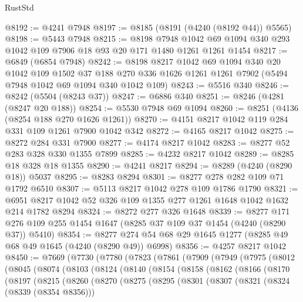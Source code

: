 \begin{lexlean}{RustStd}
\begin{coremodule}
@8192 := @4241 @7948
@8197 := @8185 (@8191 (@4240 (@8192 @44)) @5565)
@8198 := @5443 @7948
@8215 := @8198
    @7948
    @1042
    @69
    @1094
    @340
    @293
    @1042
    @109
    @7906
    @18
    @93
    @20
    @171
    @1480
    @1261
    @1261
    @1454
@8217 := @6849 (@6854 @7948)
@8242 := @8198
    @8217
    @1042
    @69
    @1094
    @340
    @20
    @1042
    @109
    @1502
    @37
    @188
    @270
    @336
    @1626
    @1261
    @1261
    @7902
    (@5494 @7948 @1042 @69 @1094 @340 @1042 @109)
@8243 := @5516 @340
@8246 := @8242 (@5504 (@8243 @37))
@8247 := @6886 @340
@8251 := @8246 (@4281 (@8247 @20 @188))
@8254 := @5530 @7948 @69 @1094
@8260 := @8251 (@4136 (@8254 @188 @270 @1626 @1261))
@8270 := @4151 @8217 @1042 @119 @284 @331 @109 @1261 @7900 @1042 @342
@8272 := @4165 @8217 @1042
@8275 := @8272 @284 @331 @7900
@8277 := @4174 @8217 @1042
@8283 := @8277 @52 @283 @328 @330 @1355 @7899
@8285 := @4232 @8217 @1042
@8289 := @8285 @18 @328 @18 @1355
@8290 := @4241 @8217
@8294 := @8289 (@4240 (@8290 @18)) @5037
@8295 := @8283 @8294
@8301 := @8277 @278 @282 @109 @71 @1792 @6510
@8307 := @5113 @8217 @1042 @278 @109 @1786 @1790
@8321 := @6951 @8217 @1042 @52 @326 @109 @1355 @277 @1261 @1648 @1042 @1632 @214 @1782 @8294
@8324 := @8272 @277 @326 @1648
@8339 := @8277 @171 @276 @109 @255 @1454 @1647 (@8285 @37 @109 @37 @1454 (@4240 (@8290 @37)) @5410)
@8354 := @8277 @274 @54 @68 @29 @1645 @1277 (@8285 @49 @68 @49 @1645 (@4240 (@8290 @49)) @6998)
@8356 := @4257 @8217 @1042
@8450 := @7669
    (@7730
      (@7780
        (@7823
          (@7861
            (@7909
              (@7949
                (@7975
                  (@8012
                    (@8045
                      (@8074
                        (@8103
                          (@8124
                            (@8140
                              (@8154
                                (@8158
                                  (@8162
                                    (@8166
                                      (@8170
                                        (@8197
                                          (@8215
                                            (@8260
                                              (@8270
                                                (@8275
                                                  (@8295
                                                    (@8301
                                                      (@8307
                                                        (@8321
                                                          (@8324 (@8339 (@8354 @8356)))

\end{coremodule}
\end{lexlean}
